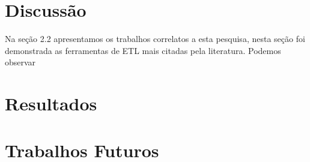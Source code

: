 \section{Discussão}

Na seção 2.2 apresentamos os trabalhos correlatos a esta pesquisa, nesta seção foi demonstrada as ferramentas de ETL mais citadas pela literatura. Podemos observar 

\section{Resultados}

\lipsum[2-4]

\section{Trabalhos Futuros}